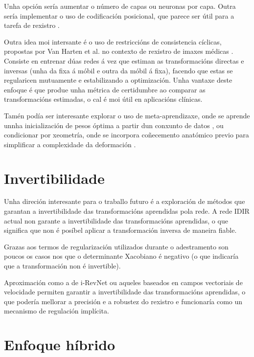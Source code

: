 Unha opción sería aumentar o número de capas ou neuronas por capa. Outra sería implementar o uso de codificación posicional, que parece ser útil para a tarefa de rexistro \cite{mueller2022instant}.

Outra idea moi intersante é o uso de restriccións de consistencia cíclicas, propostas por Van Harten et al. no contexto de rexistro de imaxes médicas \cite{van_Harten_2024}. Consiste en entrenar dúas redes á vez que estiman as transformacións directas e inversas (unha da fixa á móbil e outra da móbil á fixa), facendo que estas se regularicen mutuamente e estabilizando a optimización.
Unha vantaxe deste enfoque é que produe unha métrica de certidumbre ao comparar as transformacións estimadas, o cal é moi útil en aplicacións clínicas.

Tamén podía ser interesante explorar o uso de meta-aprendizaxe, onde se aprende unnha inicialización de pesos óptima a partir dun conxunto de datos \cite{learnedinit}, ou condicionar por xeometría, onde se incorpora coñecemento anatómico previo para simplificar a complexidade da deformación \cite{harten2023deformable}.  

\section{Invertibilidade}
\label{sec:Invertibilidade}

Unha direción interesante para o traballo futuro é a exploración de métodos que garantan a invertibilidade das transformacións aprendidas pola rede.
A rede IDIR actual non garante a invertibilidade das transformacións aprendidas, o que significa que non é posíbel aplicar a transformación inversa de maneira fiable.

Grazas aos termos de regularización utilizados durante o adestramento son poucos os casos nos que o determinante Xacobiano é negativo (o que indicaría que a transformación non é invertible).

Aproximación como a de i-RevNet \cite{jacobsen2018irevnetdeepinvertiblenetworks} ou aqueles baseados en campos vectoriais de velocidade \cite{sun2024medicalimageregistrationneural} permiten garantir a invertibilidade das transformacións aprendidas, o que podería mellorar a precisión e a robustez do rexistro e funcionaría como un mecanismo de regulación implícita.

\section{Enfoque híbrido}
\label{sec:Enfoque híbrido}

